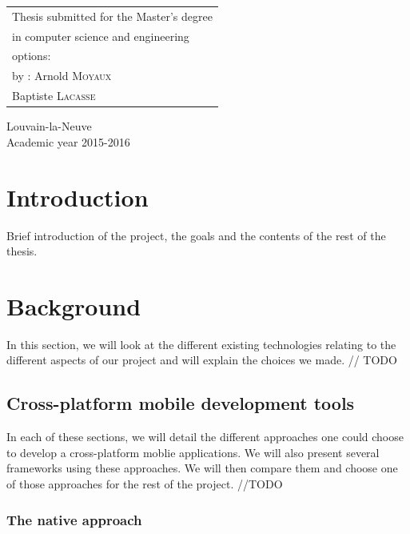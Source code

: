 \documentclass[11pt, a4paper]{report}
\newcommand\nameone{Arnold \textsc{Moyaux}}
\newcommand\nametwo{Baptiste \textsc{Lacasse}}
\newcommand\years{2015-2016}
\begin{document}
\begin{minipage}{.5\textwidth}
\begin{tabular}{l}
Thesis submitted for the Master's degree
\\ in computer science and engineering
\\ options: \
\\ by : \nameone
\\ 	   \nametwo
\end{tabular}
\end{minipage}
\vfill
\begin{center}
Louvain-la-Neuve
\\ Academic year \years
\end{center}

\tableofcontents %

\newpage %


\chapter{Introduction} %

Brief introduction of the project, the goals and the contents of the rest of the thesis.


\chapter{Background}

In this section, we will look at the different existing technologies relating to the different aspects of our project and will explain the choices we made. // TODO

\section{Cross-platform mobile development tools}

In each of these sections, we will detail the different approaches one could choose to develop a cross-platform moblie applications. We will also present several frameworks using these approaches. We will then compare them and choose one of those approaches for the rest of the project. //TODO
\subsection{The native approach}
\end{document}
